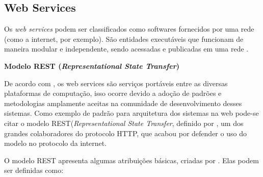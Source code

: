 \subsection{Web Services}

Os \textit{web services} podem ser classificados como softwares fornecidos por uma rede (como a internet, por exemplo). São entidades executáveis que funcionam de maneira modular e independente, sendo acessadas e publicadas em uma rede \cite{falter2009system}.
 
 \textbf{Modelo REST (\textit{Representational State Transfer})}
 
 De acordo com , os web services são serviços portáveis entre as diversas plataformas de computação, isso ocorre devido a adoção de padrões e metodologias amplamente aceitas na comunidade de desenvolvimento desses sistemas. Como exemplo de padrão para arquitetura dos sistemas na web pode-se citar o modelo REST(\textit{Representational State Transfer}, definido por , um dos grandes colaboradores do protocolo HTTP, que acabou por defender o uso do modelo no protocolo da internet.

O modelo REST apresenta algumas atribuições básicas, criadas por \cite{fielding2000architectural}. Elas podem ser definidas como:

